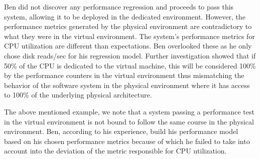 Ben did not discover any performance regression and proceeds to pass this system, allowing it to be deployed in the dedicated environment. However, the performance metrics generated by the physical environment are contradictory to what they were in the virtual environment. The system's performance metrics for CPU utilization are different than expectations. Ben overlooked these as he only chose disk reads/sec for his regression model. Further investigation showed that if 50\% of the CPU is dedicated to the virtual machine, this will be considered 100\% by the performance counters in the virtual environment thus mismatching the behavior of the software system in the physical environment where it has access to 100\% of the underlying physical architecture. \cite{vmwareCPU}

The above mentioned example, we note that a system passing a performance test in the virtual environment is not bound to follow the same course in the physical environment. Ben, according to his experience, build his performance model based on his chosen performance metrics because of which he failed to take into account into the deviation of the metric responsible for CPU utilization. 


